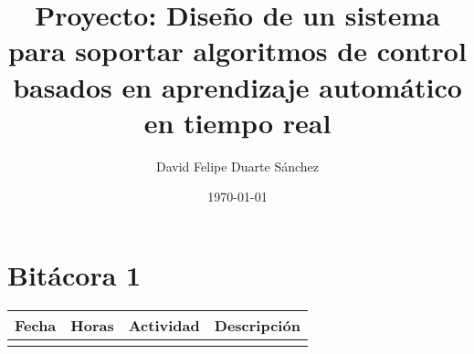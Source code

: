 \documentclass{article}
\title{Proyecto: Diseño de un sistema para soportar algoritmos de control basados en aprendizaje automático en tiempo real}
\author{David Felipe Duarte Sánchez}
\date{\today}
\begin{document}
\maketitle
\section*{Bitácora 1}

\begin{longtable}[c]{|c|c|c|p{6cm}|}
\hline
\textbf{Fecha} & \textbf{Horas} & \textbf{Actividad} & \textbf{Descripción} \\
\hline
\endhead
\hline
\endfoot

\hline
\end{longtable}

\vspace{6cm}



\end{document}
